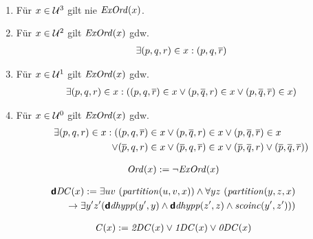 \begin{hyp}\
    \begin{enumerate}
        \item Für $x \in \mathcal{U}^3$ gilt nie $\mathit{ExOrd}(x)$.
        \item Für $x \in \mathcal{U}^2$ gilt $\mathit{ExOrd}(x)$ gdw.
            \begin{align*}
                \exists (p,q,r) \in x : (p,q,\overline{r})
            \end{align*}
        \item Für $x \in \mathcal{U}^1$ gilt $\mathit{ExOrd}(x)$ gdw.
            \begin{align*}
                \exists (p,q,r) \in x : ((p,q,\overline{r}) \in x \lor (p,\overline{q},r) \in x \lor (p,\overline{q},\overline{r}) \in x)
            \end{align*}
        \item Für $x \in \mathcal{U}^0$ gilt $\mathit{ExOrd}(x)$ gdw.
            \begin{align*}
                \exists (p,q,r) \in x : (&(p,q,\overline{r}) \in x \lor (p,\overline{q},r) \in x \lor (p,\overline{q},\overline{r}) \in x\\
                \lor &(\overline{p},q,r) \in x \lor (\overline{p},q,\overline{r}) \in x \lor (\overline{p},\overline{q},r) \lor (\overline{p},\overline{q},\overline{r}))
            \end{align*}   
    \end{enumerate}

\end{hyp}


\begin{erin}
    \begin{align*}
        \mathit{Ord}(x) := \neg\mathit{ExOrd}(x)
    \end{align*}
\end{erin}

\begin{erin}
    \begin{align*}
        \GdDC(x) := \exists uv\ (\Gpartition(u,v,x)) \wedge \forall yz\ (\Gpartition(y,z,x)\\ 
        \to 
        \exists y'z'(\Gddhypp(y',y) \wedge \Gddhypp(z',z) \wedge \Gscoinc(y',z')))
    \end{align*}
\end{erin}

\begin{erin}
    \begin{align*}
        \mathit{C}(x) := \mathit{2DC}(x) \vee \mathit{1DC}(x) \vee \mathit{0DC}(x)
    \end{align*}
\end{erin}

